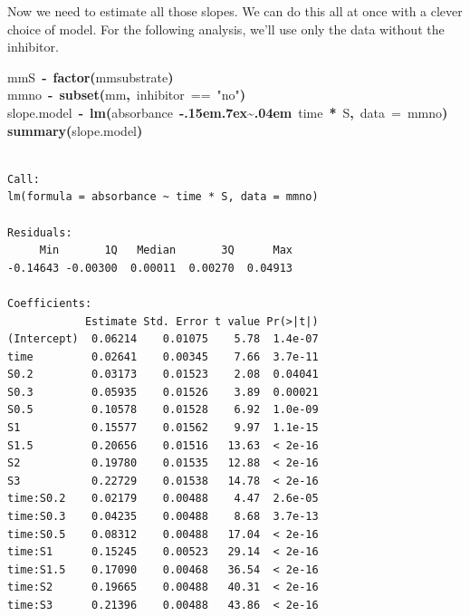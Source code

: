 \documentclass{article}
\makeatletter
\newcommand{\hlfunctioncall}[1]{\textcolor[rgb]{0.501960784313725,0,0.329411764705882}{\textbf{#1}}}%
\newcommand{\hlstring}[1]{\textcolor[rgb]{0.6,0.6,1}{#1}}%
\newcommand{\hlkeyword}[1]{\textcolor[rgb]{0,0,0}{\textbf{#1}}}%
\newcommand{\hlargument}[1]{\textcolor[rgb]{0.690196078431373,0.250980392156863,0.0196078431372549}{#1}}%
\newcommand{\hlassignement}[1]{\textcolor[rgb]{0,0,0}{\textbf{#1}}}%
\newcommand{\hlsymbol}[1]{\textcolor[rgb]{0,0,0}{#1}}%
\def\urltilda{\kern -.15em\lower .7ex\hbox{\~{}}\kern .04em}%
\newcommand{\hlstd}[1]{\textcolor[rgb]{0,0,0}{#1}}%
\newenvironment{kframe}{%
 \def\FrameCommand##1{\hskip\@totalleftmargin \hskip-\fboxsep
 \colorbox{shadecolor}{##1}\hskip-\fboxsep
     \hskip-\linewidth \hskip-\@totalleftmargin \hskip\columnwidth}%
 \MakeFramed {\advance\hsize-\width
   \@totalleftmargin\z@ \linewidth\hsize
   \@setminipage}}%
 {\par\unskip\endMakeFramed}
\newenvironment{knitrout}{}{} %
\makeatother
\begin{document}
Now we need to estimate all those slopes.  We can do this all at once with a clever
choice of model.  For the following analysis, we'll use only the data without 
the inhibitor.
\begin{knitrout}
\color{fgcolor}\begin{kframe}
\begin{flushleft}
\ttfamily\noindent
\hlsymbol{mm}\hlkeyword{\usebox{\hlnormalsizeboxdollar}}\hlsymbol{S}{\ }\hlassignement{\usebox{\hlnormalsizeboxlessthan}-}{\ }\hlfunctioncall{factor}\hlkeyword{(}\hlsymbol{mm}\hlkeyword{\usebox{\hlnormalsizeboxdollar}}\hlsymbol{substrate}\hlkeyword{)}\hspace*{\fill}\\
\hlstd{}\hlsymbol{mmno}{\ }\hlassignement{\usebox{\hlnormalsizeboxlessthan}-}{\ }\hlfunctioncall{subset}\hlkeyword{(}\hlsymbol{mm}\hlkeyword{,}{\ }\hlsymbol{inhibitor}{\ }=={\ }\hlstring{"{}no"{}}\hlkeyword{)}\hspace*{\fill}\\
\hlstd{}\hlsymbol{slope.model}{\ }\hlassignement{\usebox{\hlnormalsizeboxlessthan}-}{\ }\hlfunctioncall{lm}\hlkeyword{(}\hlsymbol{absorbance}{\ }\hlkeyword{\urltilda{}}{\ }\hlsymbol{time}{\ }\hlkeyword{*}{\ }\hlsymbol{S}\hlkeyword{,}{\ }\hlargument{data}{\ }\hlargument{=}{\ }\hlsymbol{mmno}\hlkeyword{)}\hspace*{\fill}\\
\hlstd{}\hlfunctioncall{summary}\hlkeyword{(}\hlsymbol{slope.model}\hlkeyword{)}\mbox{}
\normalfont
\end{flushleft}
\begin{verbatim}

Call:
lm(formula = absorbance ~ time * S, data = mmno)

Residuals:
     Min       1Q   Median       3Q      Max 
-0.14643 -0.00300  0.00011  0.00270  0.04913 

Coefficients:
            Estimate Std. Error t value Pr(>|t|)
(Intercept)  0.06214    0.01075    5.78  1.4e-07
time         0.02641    0.00345    7.66  3.7e-11
S0.2         0.03173    0.01523    2.08  0.04041
S0.3         0.05935    0.01526    3.89  0.00021
S0.5         0.10578    0.01528    6.92  1.0e-09
S1           0.15577    0.01562    9.97  1.1e-15
S1.5         0.20656    0.01516   13.63  < 2e-16
S2           0.19780    0.01535   12.88  < 2e-16
S3           0.22729    0.01538   14.78  < 2e-16
time:S0.2    0.02179    0.00488    4.47  2.6e-05
time:S0.3    0.04235    0.00488    8.68  3.7e-13
time:S0.5    0.08312    0.00488   17.04  < 2e-16
time:S1      0.15245    0.00523   29.14  < 2e-16
time:S1.5    0.17090    0.00468   36.54  < 2e-16
time:S2      0.19665    0.00488   40.31  < 2e-16
time:S3      0.21396    0.00488   43.86  < 2e-16


\end{verbatim}
\end{kframe}
\end{knitrout}
\end{document}

